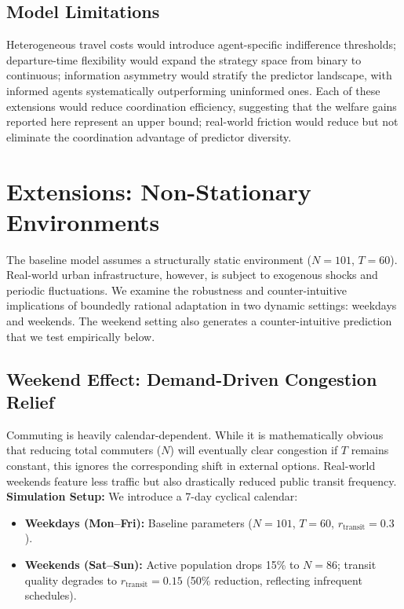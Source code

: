 \subsection{Model Limitations}

Heterogeneous travel costs would introduce agent-specific indifference thresholds; departure-time flexibility would expand the strategy space from binary to continuous; information asymmetry would stratify the predictor landscape, with informed agents systematically outperforming uninformed ones. Each of these extensions would reduce coordination efficiency, suggesting that the welfare gains reported here represent an upper bound; real-world friction would reduce but not eliminate the coordination advantage of predictor diversity.\\

\section{Extensions: Non-Stationary Environments}

The baseline model assumes a structurally static environment ($N=101$, $T=60$). Real-world urban infrastructure, however, is subject to exogenous shocks and periodic fluctuations. We examine the robustness and counter-intuitive implications of boundedly rational adaptation in two dynamic settings: weekdays and weekends. The weekend setting also generates a counter-intuitive prediction that we test empirically below.  \\

\subsection{Weekend Effect: Demand-Driven Congestion Relief}

Commuting is heavily calendar-dependent. While it is mathematically obvious that reducing total commuters ($N$) will eventually clear congestion if $T$ remains constant, this ignores the corresponding shift in external options. Real-world weekends feature less traffic but also drastically reduced public transit frequency. \\

\textbf{Simulation Setup:} We introduce a 7-day cyclical calendar: \\

\begin{itemize}
    \item \textbf{Weekdays (Mon--Fri):} Baseline parameters ($N=101$, $T=60$, $r_{\text{transit}} = 0.3$).
    \item \textbf{Weekends (Sat--Sun):} Active population drops 15\% to $N=86$; transit quality degrades to $r_{\text{transit}} = 0.15$ (50\% reduction, reflecting infrequent schedules).
\end{itemize}

